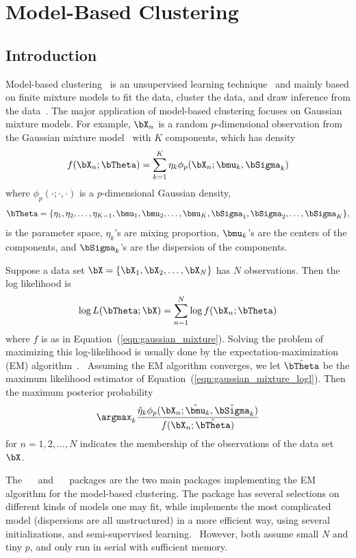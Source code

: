 
\chapter{Model-Based Clustering}
\label{chp:pmclust}

\section{Introduction}

Model-based clustering~
is an unsupervised learning technique~
and mainly based on finite mixture models to fit the data, cluster the data,
and draw inference from the data~\citep{Fraley2002,Melnykov2010}. The major application of
model-based clustering focuses on Gaussian mixture models. For example,
$\bX_n$ is a random $p$-dimensional observation from
the Gaussian mixture model~
with $K$ components, which has density
\begin{equation}
f(\bX_n; \bTheta) = \sum_{k = 1}^K \eta_k \phi_p(\bX_n; \bmu_k, \bSigma_k)
\label{eqn:gaussian_mixture}
\end{equation}
where $\phi_p(\cdot;\cdot,\cdot)$ is a $p$-dimensional Gaussian density,
$$
\bTheta = \{\eta_1, \eta_2, \ldots, \eta_{K-1},
\bmu_1, \bmu_2, \ldots, \bmu_K, \bSigma_1, \bSigma_2, \ldots, \bSigma_K\},
$$
is the parameter space,
$\eta_k$'s are mixing proportion, $\bmu_k$'s are the centers of the components, and
$\bSigma_k$'s are the dispersion of the components.

Suppose a data set $\bX = \{\bX_1, \bX_2, \ldots, \bX_N\}$ has
$N$ observations.  Then the log likelihood is
\begin{equation}
\log L(\bTheta; \bX) = \sum_{n = 1}^N \log f(\bX_n; \bTheta)
\label{eqn:gaussian_mixture_logl}
\end{equation}
where $f$ is as in Equation~(\ref{eqn:gaussian_mixture}).
Solving the problem of maximizing this log-likelihood is usually done by the expectation-maximization (EM)
algorithm~\citep{Dempster1977}.~
Assuming the EM algorithm converges, we let $\hat{\bTheta}$ be the
maximum likelihood estimator of Equation~(\ref{eqn:gaussian_mixture_logl}).
Then the maximum posterior probability
$$
\argmax_k
\frac{\hat{\eta}_k\phi_p(\bX_n; \hat{\bmu}_k, \hat{\bSigma}_k)
    }{f(\bX_n; \hat{\bTheta})}
$$
for $n = 1, 2, \ldots, N$
indicates the membership of the observations of the data set $\bX$.


The ~\citep{mclust}~ and
~\citep{Chen2012EMClusterpackage}~ packages
are the two main  packages implementing the EM algorithm for the
model-based clustering.
The  package has several selections on different kinds of models one may fit, while  
implements the most complicated model (dispersions are all unstructured)
in a more efficient way, using several initializations, and
semi-supervised learning.~
However, both assume small $N$ and tiny $p$, and only run in serial with
sufficient memory.

